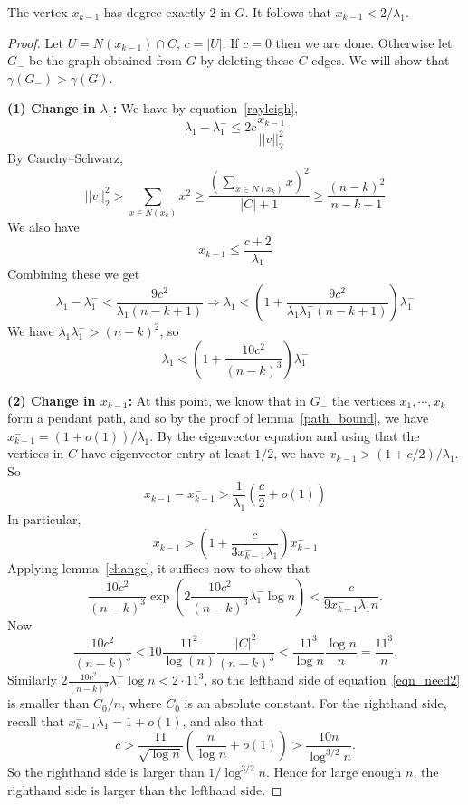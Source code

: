 \begin{lemma}\label{k_1_lemma}
 The vertex $x_{k-1}$ has degree exactly $2$ in $G$.  It follows that
 $x_{k-1} < 2 / \lambda_1$.
\end{lemma}
\begin{proof}
  Let $U = N(x_{k-1}) \cap C$, $c = |U|$.  If $c=0$ then we are done.
  Otherwise let $G_-$ be the graph obtained from $G$ by deleting these
  $C$ edges.  We will show that $\gamma(G_-) > \gamma(G)$.

  \noindent \textbf{(1) Change in $\lambda_1$:}
  We have by equation~\ref{rayleigh}, 
   \[ \lambda_1 - \lambda^{-}_1 \leq 2c \frac{x_{k-1}}{||v||_2^2}\]
  By Cauchy--Schwarz,
   \[ ||v||_2^2 > \sum_{x \in N(x_{k})} x^2 \geq \frac{\left(\sum_{x \in N(x_k)} x\right)^2}{|C|+1} \geq \frac{(n-k)^2}{n-k+1}\]
  We also have
   \[ x_{k-1} \leq \frac{c+2}{\lambda_1}\]
  Combining these we get
   \[ \lambda_1 - \lambda_1^{-} < \frac{9c^2}{\lambda_1 (n-k+1)} \Rightarrow \lambda_1 < \left(1 + \frac{9c^2}{\lambda_1 \lambda_1^{-} (n-k+1)}\right) \lambda_1^{-}\]
  We have $\lambda_1 \lambda_1^{-} > (n-k)^2$, so
  \[ \lambda_1 < \left( 1 + \frac{10c^2}{(n-k)^3} \right) \lambda_1^{-} \]
  
  \noindent \textbf{(2) Change in $x_{k-1}$:}
  At this point, we know that in $G_-$ the vertices $x_1,\cdots , x_{k}$ form a pendant path, and so by the proof of lemma~\ref{path_bound}, we have $x_{k-1}^- = (1+o(1)) / \lambda_1$. By the eigenvector equation and using that the vertices in $C$ have eigenvector entry at least $1/2$, we have $x_{k-1} > (1 + c/2) / \lambda_1$.  So
   \begin{equation*}
     x_{k-1} - x_{k-1}^{-} > \frac{1}{\lambda_1} \left( \frac{c}{2} + o(1) \right)
   \end{equation*}
   In particular,
    \[ x_{k-1} > \left( 1 + \frac{c}{3x_{k-1}^{-}\lambda_1}\right) x_{k-1}^-\]
   Applying lemma~\ref{change}, it suffices now to show that
   \begin{equation}\label{eqn_need2}
    \frac{10c^2}{(n-k)^3} \exp \left(2 \frac{10c^2}{(n-k)^3} \lambda_1^- \log n \right) < \frac{c}{9 x_{k-1}^- \lambda_1 n} .
   \end{equation}
   Now
    \[ \frac{10c^2}{(n-k)^3} < 10 \frac{11^2}{\log(n)} \frac{|C|^2}{(n-k)^3} < \frac{11^3}{\log n} \frac{\log n}{n} = \frac{11^3}{n} .\]
    Similarly $2 \frac{10c^2}{(n-k)^3} \lambda_1^- \log n < 2\cdot 11^3$, so the lefthand side of equation~\ref{eqn_need2} is smaller than $C_0 / n$, where
   $C_0$ is an absolute constant.
   For the righthand side, recall that $x_{k-1}^- \lambda_1 = 1 + o(1)$, and also that
    \[ c > \frac{11}{\sqrt{\log n}} \left( \frac{n}{\log n} + o(1) \right) > \frac{10n}{\log^{3/2} n} .\]
   So the righthand side is larger than $1 / \log^{3/2}{n}$.  Hence for large
   enough $n$, the righthand side is larger than the lefthand side.
  
\end{proof}

